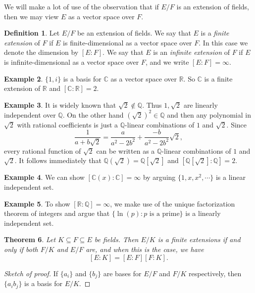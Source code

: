 \documentclass[12pt]{report}
\newtheorem{theorem}{Theorem}[section]
\theoremstyle{definition}
\newtheorem{definition}[theorem]{Definition}
\newtheorem{example}[theorem]{Example}
\newcommand{\CC}{\mathbb{C}}
\newcommand{\QQ}{\mathbb{Q}}
\newcommand{\RR}{\mathbb{R}}
\begin{document}
We will make a lot of use of the observation that if $E/F$ is an extension
of fields, then we may view $E$ as a vector space over $F$.

\begin{definition}
	Let $E/F$ be an extension of fields. We say that $E$ is a \emph{finite extension} of $F$ if $E$ is finite-dimensional as a vector space over $F$. In this case we denote the dimension by $[E:F]$. We say that $E$ is an \emph{infinite extension} of $F$ if $E$ is infinite-dimensional as a vector space over $F$, and we write $[E:F] = \infty$.
\end{definition}

\begin{example}
	$\{1,i\}$ is a basis for $\CC$ as a vector space over $\RR$. So $\CC$ is a finite extension of $\RR$ and $[\CC:\RR]=2$.
\end{example}

\begin{example}
	It is widely known that $\sqrt{2}\notin\QQ$. Thus $1,\sqrt{2}$ are linearly independent over $\QQ$. On the other hand $(\sqrt{2})^2\in \QQ$ and then any polynomial in $\sqrt{2}$ with rational coefficients is just a $\QQ$-linear combinations of $1$ and $\sqrt{2}$. Since $$\frac{1}{a+b\sqrt{2}} = \frac{a}{a^2-2b^2} +\frac{-b}{a^2-2b^2}\sqrt{2},$$ every rational function of $\sqrt{2}$ can be written as a $\QQ$-linear combinations of $1$ and $\sqrt{2}$. It follows immediately that $\QQ(\sqrt{2})=\QQ[\sqrt{2}]$ and $[\QQ[\sqrt{2}]:\QQ]=2$.
\end{example}

\begin{example}
	We can show $[\CC(x):\CC]=\infty$ by arguing $\{1,x,x^2,\cdots\}$ is a linear independent set.
\end{example}

\begin{example}
	To show $[\RR:\QQ]=\infty$, we make use of the unique factorization theorem of integers and argue that $\{\ln(p): p \mbox{ is a prime}\}$ is a linearly independent set.
\end{example}

\begin{theorem}
	Let $K\subseteq F\subseteq E$ be fields. Then $E/K$ is a finite extensions if and only if both $F/K$ and $E/F$  are, and when this is the case, we have $$[E:K]=[E:F][F:K].$$
\end{theorem}

\begin{proof}[Sketch of proof]
	If $\{a_i\}$ and $\{b_j\}$ are bases for $E/F$ and $F/K$ respectively, then $\{a_ib_j\}$ is a basis for $E/K$.
\end{proof}
\end{document}
